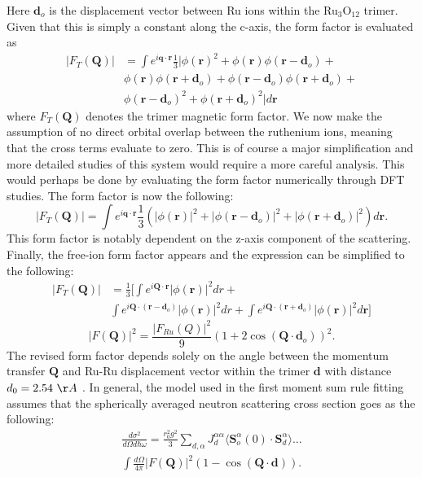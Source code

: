 \documentclass[%
 reprint,
superscriptaddress,
 amsmath,amssymb,
 aps,
 prb,
]{revtex4-2}
\begin{document}
Here $\textbf{d}_o$ is the displacement vector between Ru ions within the Ru$_3$O$_{12}$ trimer. Given that this is simply a constant along the c-axis, the form factor is evaluated as
\begin{align}
    |F_T(\textbf{Q})| & = \int e^{i\textbf{q}\cdot\textbf{r}}\frac{1}{3}|\phi(\textbf{r})^2+\phi(\textbf{r})\phi(\textbf{r}-\textbf{d}_o)+\\ \nonumber
                &\phi(\textbf{r})\phi(\textbf{r}+\textbf{d}_o)+\phi(\textbf{r}-\textbf{d}_o)\phi(\textbf{r}+\textbf{d}_o) +\\ \nonumber
                &\phi(\textbf{r}-\textbf{d}_o)^2+\phi(\textbf{r}+\textbf{d}_o)^2|d\textbf{r} \nonumber
\end{align}
where $F_T(\textbf{Q})$ denotes the trimer magnetic form factor. We now make the assumption of no direct orbital overlap between the ruthenium ions, meaning that the cross terms evaluate to zero. This is of course a major simplification and more detailed studies of this system would require a more careful analysis. This would perhaps be done by evaluating the form factor numerically through DFT studies. The form factor is now the following:
\begin{equation}
    |F_{T}(\textbf{Q})| = \int e^{i\textbf{q}\cdot\textbf{r}} \frac{1}{3}( |\phi(\textbf{r})|^2+|\phi(\textbf{r}-\textbf{d}_o)|^2+|\phi(\textbf{r}+\textbf{d}_o)|^2)d\textbf{r}.
    \label{wavfunc_ff_eq}
\end{equation}
This form factor is notably dependent on the z-axis component of the scattering. Finally, the free-ion form factor appears and the expression can be simplified to the following:
\begin{align}
    |F_T(\textbf{Q})| & = \frac{1}{3}\bigg[\int e^{i\textbf{Q}\cdot\textbf{r}}|\phi(\textbf{r})|^2dr+\\ \nonumber
                    &\int e^{i\textbf{Q}\cdot(\textbf{r}-\textbf{d}_o)}|\phi(\textbf{r})|^2dr+\int e^{i\textbf{Q}\cdot(\textbf{r}+\textbf{d}_o)}|\phi(\textbf{r})|^2d\textbf{r}\bigg]
\end{align}
\begin{equation}
    |F(\textbf{Q})|^2=\frac{|F_{Ru}(Q)|^2}{9}(1+2\cos(\textbf{Q}\cdot \textbf{d}_o))^2.
\end{equation}
The revised form factor depends solely on the angle between the momentum transfer $\textbf{Q}$ and Ru-Ru displacement vector within the trimer $\textbf{d}$ with distance $d_0=2.54\ \AA$ . In general, the model used in the first moment sum rule fitting assumes that the spherically averaged neutron scattering cross section goes as the following:
\begin{eqnarray}
    \frac{d\sigma^2}{d\Omega d\hbar\omega} =\frac{r_0^2 g^2}{3}\sum_{d,\alpha} J_d^{\alpha\alpha}\langle \textbf{S}_o^{\alpha}(0)\cdot \textbf{S}_d^{\alpha} \rangle \ldots \nonumber \\
    \int \frac{d\Omega}{4\pi}|F(\textbf{Q})|^2(1-\cos(\textbf{Q}\cdot\textbf{d})).
    \label{powderxc_eq}
\end{eqnarray}
\end{document}
